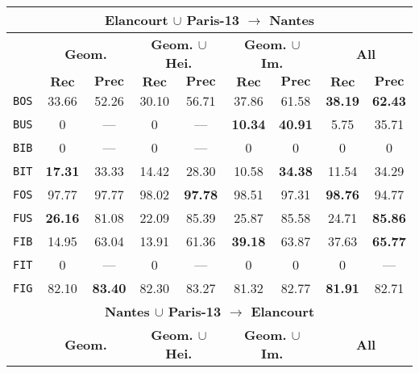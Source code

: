 \begin{table}
\begin{center}
\begin{tabular}{|c | c c | c c | c c | c c |}
                    \hline
                    \hline
                    \multicolumn{9}{|c|}{\textbf{Elancourt $\cup$ Paris-13 $\rightarrow$ Nantes}}\\
                    \hline
                    &\multicolumn{2}{c|}{\textbf{Geom.}} & \multicolumn{2}{c|}{\textbf{Geom. $\cup$ Hei.}} & \multicolumn{2}{c|}{\textbf{Geom. $\cup$ Im.}} & \multicolumn{2}{x{2.4cm}|}{\textbf{All}}\\
                    \cline{2-9}
                    & \(\bm{Rec}\) & \(\bm{Prec}\) &  \(\bm{Rec}\) & \(\bm{Prec}\) &  \(\bm{Rec}\) & \(\bm{Prec}\) &  \(\bm{Rec}\) & \(\bm{Prec}\) \\
                    \hline
                    \texttt{BOS} & 33.66 & 52.26 & 30.10 & 56.71 & 37.86 & 61.58 & \textbf{38.19} & \textbf{62.43} \\
                    \hline
                    \texttt{BUS} & 0 & --- & 0 & --- & \textbf{10.34} & \textbf{40.91} & 5.75 & 35.71 \\
                    \hline
                    \texttt{BIB} & 0 & --- & 0 & --- & 0 & 0 & 0 & 0 \\
                    \hline
                    \texttt{BIT} & \textbf{17.31} & 33.33 & 14.42 & 28.30 & 10.58 & \textbf{34.38} & 11.54 & 34.29 \\
                    \hline
                    \texttt{FOS} & 97.77 & 97.77 & 98.02 & \textbf{97.78} & 98.51 & 97.31 & \textbf{98.76} & 94.77 \\
                    \hline
                    \texttt{FUS} & \textbf{26.16} & 81.08 & 22.09 & 85.39 & 25.87 & 85.58 & 24.71 & \textbf{85.86} \\
                    \hline
                    \texttt{FIB} & 14.95 & 63.04 & 13.91 & 61.36 & \textbf{39.18} & 63.87 & 37.63 & \textbf{65.77} \\
                    \hline
                    \texttt{FIT} & 0 & --- & 0 & --- & 0 & 0 & 0 & --- \\
                    \hline
                    \texttt{FIG} & 82.10 & \textbf{83.40} & 82.30 & 83.27 & 81.32 & 82.77 & \textbf{81.91} & 82.71 \\
                    \hline
                    \hline
                    \multicolumn{9}{|c|}{\textbf{Nantes $\cup$ Paris-13 $\rightarrow$ Elancourt}}\\
                    \hline
                    &\multicolumn{2}{c|}{\textbf{Geom.}} & \multicolumn{2}{c|}{\textbf{Geom. $\cup$ Hei.}} & \multicolumn{2}{c|}{\textbf{Geom. $\cup$ Im.}} & \multicolumn{2}{x{2.4cm}|}{\textbf{All}}\\

\end{tabular}
\end{center}
\end{table}
